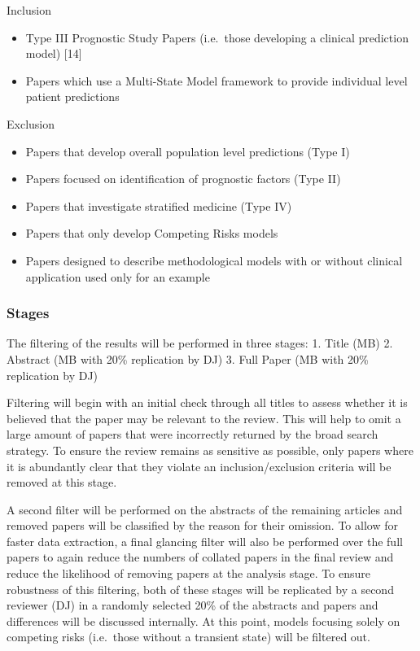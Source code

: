 \documentclass[12pt,PhD,twoside,openright]{muthesis}
\providecommand{\tightlist}{%
  \setlength{\itemsep}{0pt}\setlength{\parskip}{0pt}}
\begin{document}
Inclusion
\begin{itemize}
\tightlist
\item
  Type III Prognostic Study Papers (i.e.~those developing a clinical prediction model) {[}14{]}
\item
  Papers which use a Multi-State Model framework to provide individual level patient predictions
\end{itemize}
Exclusion
\begin{itemize}
\tightlist
\item
  Papers that develop overall population level predictions (Type I)
\item
  Papers focused on identification of prognostic factors (Type II)
\item
  Papers that investigate stratified medicine (Type IV)
\item
  Papers that only develop Competing Risks models
\item
  Papers designed to describe methodological models with or without clinical application used only for an example
\end{itemize}
\hypertarget{stages}{%
\subsubsection{Stages}\label{stages}}

The filtering of the results will be performed in three stages:
1. Title (MB)
2. Abstract (MB with 20\% replication by DJ)
3. Full Paper (MB with 20\% replication by DJ)

Filtering will begin with an initial check through all titles to assess whether it is believed that the paper may be relevant to the review. This will help to omit a large amount of papers that were incorrectly returned by the broad search strategy. To ensure the review remains as sensitive as possible, only papers where it is abundantly clear that they violate an inclusion/exclusion criteria will be removed at this stage.

A second filter will be performed on the abstracts of the remaining articles and removed papers will be classified by the reason for their omission. To allow for faster data extraction, a final glancing filter will also be performed over the full papers to again reduce the numbers of collated papers in the final review and reduce the likelihood of removing papers at the analysis stage. To ensure robustness of this filtering, both of these stages will be replicated by a second reviewer (DJ) in a randomly selected 20\% of the abstracts and papers and differences will be discussed internally. At this point, models focusing solely on competing risks (i.e.~those without a transient state) will be filtered out.
\end{document}
